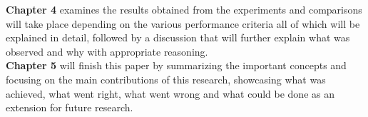 \textbf{Chapter 4} examines the results obtained from the experiments and comparisons will take place depending on the various performance criteria all of which will be explained in detail, followed by a discussion that will further explain what was observed and why with appropriate reasoning. \\

\textbf{Chapter 5} will finish this paper by summarizing the important concepts and focusing on the main contributions of this research, showcasing what was achieved, what went right, what went wrong and what could be done as an extension for future research. \\

